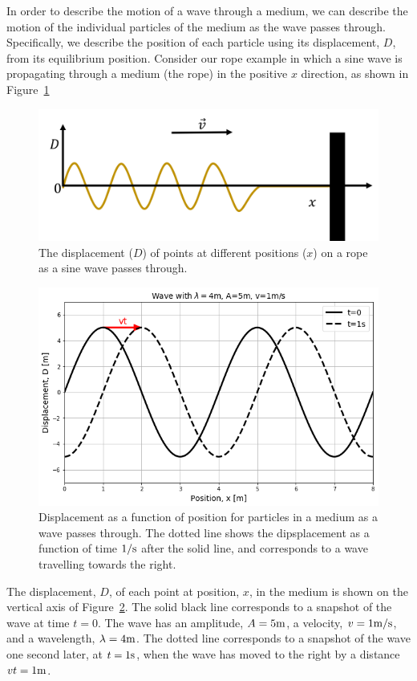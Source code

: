 In order to describe the motion of a wave through a medium, we can describe the motion of the individual particles of the medium as the wave passes through. Specifically, we describe the position of each particle using its displacement, $D$, from its equilibrium position. Consider our rope example in which a sine wave is propagating through a medium (the rope) in the positive $x$ direction, as shown in Figure~\ref{fig:waves:sinewaveaxes}

\begin{figure}[!htbp]
\centering
\includegraphics[width=0.6\linewidth]{files/sinewaveaxes-7aa4a3a1952be46789ec043b07d3782e.png}
\caption[]{The displacement ($D$) of points at different positions ($x$) on a rope as a sine wave passes through.}
\label{fig:waves:sinewaveaxes}
\end{figure}

\begin{figure}[!htbp]
\centering
\includegraphics[width=0.7\linewidth]{files/sinewave-ada62bf73e73052cf695ebf0d37a8911.png}
\caption[]{Displacement as a function of position for particles in a medium as a wave passes through. The dotted line shows the dipsplacement as a function of time ${\rm 1/s}$ after the solid line, and corresponds to a wave travelling towards the right.}
\label{fig:waves:sinewave}
\end{figure}

The displacement, $D$, of each point at position, $x$, in the medium is shown on the vertical axis of Figure~\ref{fig:waves:sinewave}. The solid black line corresponds to a snapshot of the wave at time $t=0$. The wave has an amplitude, $A=5 {\rm m}$, a velocity, $v=1 {\rm m/s}$, and a wavelength, $\lambda=4 {\rm m}$. The dotted line corresponds to a snapshot of the wave one second later, at $t=1 {\rm s}$, when the wave has moved to the right by a distance $vt=1 {\rm m}$.

